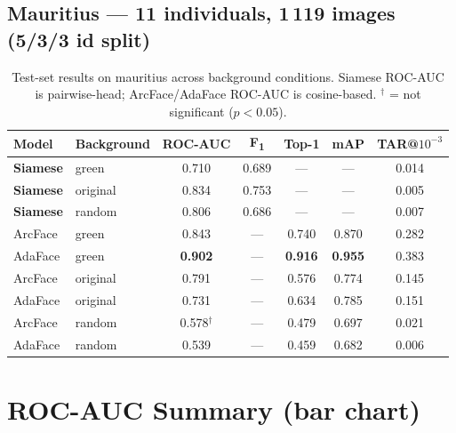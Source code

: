 \documentclass[11pt, a4paper]{article}
\newcommand{\good}[1]{\textcolor{colSiamese}{\textbf{#1}}}
\newcommand{\bestval}[1]{\textbf{#1}}
\begin{document}
\subsection{Mauritius --- 11 individuals, 1\,119 images (5/3/3 id split)}

\begin{table}[h]
\centering
\caption{Test-set results on mauritius across background conditions.
Siamese ROC-AUC is pairwise-head; ArcFace/AdaFace ROC-AUC is cosine-based.
$^{\dagger}$ = not significant ($p<0.05$).}
\label{tab:mauritius}
\setlength{\tabcolsep}{5pt}
\begin{tabular}{llccccc}
\toprule
Model & Background & ROC-AUC & F\textsubscript{1} & Top-1 & mAP & TAR@\(10^{-3}\) \\
\midrule
\good{Siamese} & green    & 0.710 & 0.689 & --- & ---   & 0.014 \\
\good{Siamese} & original & 0.834 & 0.753 & --- & ---   & 0.005 \\
\good{Siamese} & random   & 0.806 & 0.686 & --- & ---   & 0.007 \\
ArcFace        & green    & 0.843 & --- & 0.740 & 0.870 & 0.282 \\
AdaFace        & green    & \bestval{0.902} & --- & \bestval{0.916} & \bestval{0.955} & 0.383 \\
ArcFace        & original & 0.791 & --- & 0.576 & 0.774 & 0.145 \\
AdaFace        & original & 0.731 & --- & 0.634 & 0.785 & 0.151 \\
ArcFace        & random   & 0.578$^{\dagger}$ & --- & 0.479 & 0.697 & 0.021 \\
AdaFace        & random   & 0.539 & --- & 0.459 & 0.682 & 0.006 \\
\bottomrule
\end{tabular}
\end{table}

\section{ROC-AUC Summary (bar chart)}
\end{document}
